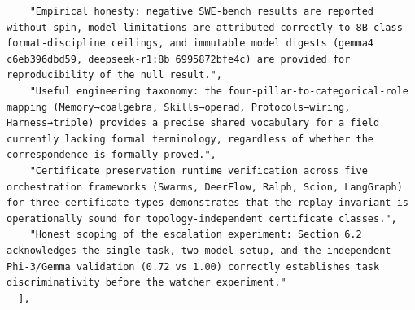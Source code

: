 \documentclass[11pt]{article}
\begin{document}
\begin{verbatim}
    "Empirical honesty: negative SWE-bench results are reported without spin, model limitations are attributed correctly to 8B-class format-discipline ceilings, and immutable model digests (gemma4 c6eb396dbd59, deepseek-r1:8b 6995872bfe4c) are provided for reproducibility of the null result.",
    "Useful engineering taxonomy: the four-pillar-to-categorical-role mapping (Memory→coalgebra, Skills→operad, Protocols→wiring, Harness→triple) provides a precise shared vocabulary for a field currently lacking formal terminology, regardless of whether the correspondence is formally proved.",
    "Certificate preservation runtime verification across five orchestration frameworks (Swarms, DeerFlow, Ralph, Scion, LangGraph) for three certificate types demonstrates that the replay invariant is operationally sound for topology-independent certificate classes.",
    "Honest scoping of the escalation experiment: Section 6.2 acknowledges the single-task, two-model setup, and the independent Phi-3/Gemma validation (0.72 vs 1.00) correctly establishes task discriminativity before the watcher experiment."
  ],

\end{verbatim}
\end{document}

